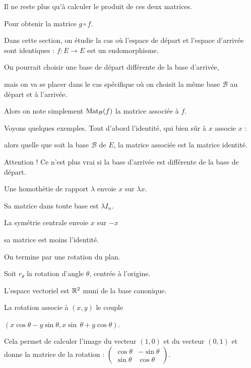\change
Il ne reste plus qu'à calculer le produit de ces deux matrices.

\change
Pour obtenir la matrice $g\circ f$.



\diapo

Dans cette section, on étudie la cas où l'espace de départ et l'espace d'arrivée 
sont identiques :
$f : E \to E$ est un endomorphisme. 

\change
On pourrait choisir une base de départ différente de la base d'arrivée,

\change
mais on va se placer dans le cas spécifique où
on choisit la même base $\mathcal{B}$ au départ et à l'arrivée.

Alors on note  simplement $\mathop{\mathrm{Mat}}\nolimits_{\mathcal{B}} (f)$ la matrice associée à $f$.
  
  
 \change
 Voyons quelques exemples. Tout d'abord l'identité, qui bien sûr à $x$ associe $x$ :
 
 \change
 alors quelle que soit la base $\mathcal{B}$ de $E$, 
 la matrice associée est la matrice identité.
 
 Attention ! Ce n'est plus vrai 
  si la base d'arrivée est différente de la base de départ.
  
 \change  
  Une homothétie de rapport $\lambda$ 
  envoie $x$ sur $\lambda x$.
  
  \change
  Sa matrice dans toute base est $\lambda I_n$.
  
  \change
  La symétrie centrale envoie $x$ sur $-x$
  
  \change
  sa matrice est moins l'identité.
  
  \change
  On termine par une rotation du plan.
  
  \change
  Soit $r_\theta$ la rotation d'angle $\theta$, centrée à l'origine.
  
  \change
  L'espace vectoriel est $\mathbb{R}^2$ muni de la base canonique.
  
  \change
  La rotation associe à $(x,y)$ le 
  couple 
  
  $(x \cos  \theta - y \sin\theta,x\sin \, \theta + y \cos\theta)$.
  
  \change
  Cela permet de calculer l'image du vecteur $(1,0)$ et du vecteur $(0,1)$
  et donne la matrice de la rotation :
  $\begin{pmatrix}
\cos\theta & -\sin\theta\\
\sin\theta & \cos\theta
\end{pmatrix}.$


